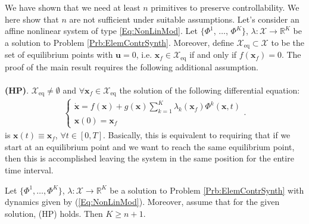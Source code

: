 \documentclass{svmult}
\newcommand{\x}{\mathbf {x}}
\begin{document}
We have shown that we need at least $n$ 
primitives to preserve controllability. We here show that $n$ are not
sufficient under suitable assumptions. Let's consider an affine nonlinear system 
of type \eqref{Eq:NonLinMod}. Let $\{\Phi^1$, $\dots$, $\Phi^K\}$, $\lambda 
: \mathcal X \rightarrow \mathbb R^K$ be a solution to Problem 
\ref{Prb:ElemContrSynth}. Moreover, define $\mathcal
X_{\mbox{eq}} \subset \mathcal X$ to be the set of equilibrium
points with $\mathbf u = 0$, i.e. $\mathbf x_f \in \mathcal
X_{\mbox{eq}}$ if and only if $f(\mathbf x_f) = 0$. The proof of
the main result requires the following additional assumption.
\\
\\
\textbf{(HP)}. $\mathcal X_{\mbox{eq}} \neq \emptyset$ and
$\forall \x_f \in \mathcal X_{\mbox{eq}}$ the solution of the
following differential equation:
\begin{eqnarray}
\left\{ \begin{array} {l} \mathbf {\dot x} = f (\mathbf x) +
g(\mathbf x) \sum_{k=1}^K \lambda_k(\x_f) \Phi^k(\x, t)\\
\mathbf x(0) = \x_f
\end{array} \right. .
\end{eqnarray}
is $\mathbf x(t) \equiv \mathbf x_f$, $\forall t \in [0, T]$.
Basically, this is equivalent to requiring that if we start at an
equilibrium point and we want to reach the same equilibrium point,
then this is accomplished leaving the system in the same position
for the entire time interval.

\begin{theorem} \label{Th:MinNumPrimNonLin}
Let $\{\Phi^1, \dots, \Phi^K\}$, $\lambda: \mathcal X \rightarrow
\mathbb R^K$ be a solution to Problem
\ref{Prb:ElemContrSynth} with dynamics given by
(\ref{Eq:NonLinMod}). Moreover, assume that for the
given solution, (HP) holds. Then $K \geq n+1$.
\end{theorem}
\end{document}
